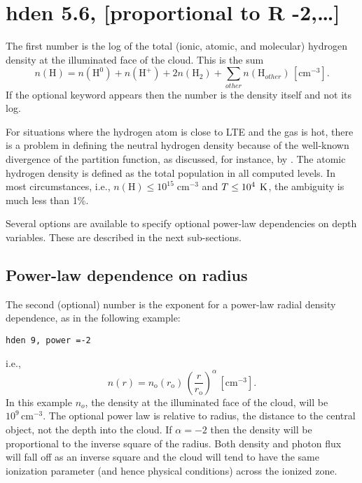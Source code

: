 \section{hden 5.6, [proportional to R -2,\dots]}

The first number is the log of the total (ionic, atomic, and molecular)
hydrogen density at the illuminated face of the cloud.
This is the sum
\begin{equation}
n\left( {\mathrm{H}} \right) = n\left( {{\mathrm{H}}^{\mathrm{0}} } \right) + n\left(
{{\mathrm{H}}^ +  } \right) + 2n\left( {{\mathrm{H}}_2 } \right) +
\sum\limits_{other} {n\left( {{\mathrm{H}}_{other}^{} } \right)}
\, [\mathrm{cm}^{-3}] .%
\end{equation}
If the optional keyword  appears then
the number is the density itself and not its log.

For situations where the hydrogen atom is close to LTE and the gas is
hot, there is a problem in defining the neutral hydrogen density because
of the well-known divergence of the partition function, as discussed, for
instance, by \citet{Mihalas1978}.
The atomic hydrogen density is defined as
the total population in all computed levels.
In most circumstances, i.e.,
$n(\mathrm{H}) \leq 10^{15}\; \mathrm{cm}^{-3}$ and $T \le 10^4\; {\rm\thinspace K}$,
the ambiguity is much less than 1\%.

Several options are available to specify optional power-law dependencies
on depth variables.  These are described in the next sub-sections.

\subsection{Power-law dependence on radius}

The second (optional) number is the exponent  for a power-law radial
density dependence, as in the following example:
\begin{verbatim}
hden 9, power =-2
\end{verbatim}
i.e.,
\begin{equation}
n\left( r \right) = n_{\mathrm{o}} \left( {r_{\mathrm{o}} } \right)\,\left(
{\frac{r}{{r_{\mathrm{o}} }}} \right)^\alpha
\,[\mathrm{cm}^{-3}].%
\end{equation}
In this example $n_o$, the density at the illuminated face
of the cloud, will
be $10^9 \, \mathrm{cm}^{-3}$.
The optional power law is relative to radius, the distance
to the central object, not the depth into the cloud.
If $\alpha = -2$ then the
density will be proportional to the inverse square of the radius.
Both
density and photon flux will fall off as an inverse square and the cloud
will tend to have the same ionization parameter (and hence physical
conditions) across the ionized zone.

